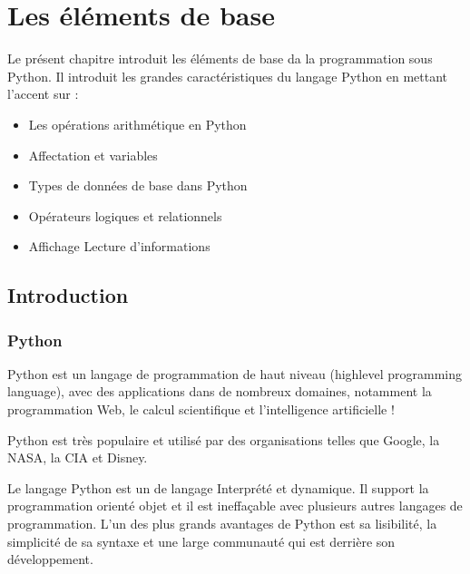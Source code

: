 \documentclass[letterpaper,10pt,french]{sphinxmanual}
\begin{document}
\chapter{Les éléments de base}
\label{\detokenize{content1:les-elements-de-base}}\label{\detokenize{content1::doc}}
\sphinxAtStartPar
Le présent chapitre introduit les éléments de base da la programmation sous Python. Il introduit les grandes caractéristiques du langage Python en mettant l’accent sur :
\begin{itemize}
\item {} 
\sphinxAtStartPar
Les opérations arithmétique en Python

\item {} 
\sphinxAtStartPar
Affectation et variables

\item {} 
\sphinxAtStartPar
Types de données de base dans Python

\item {} 
\sphinxAtStartPar
Opérateurs logiques et relationnels

\item {} 
\sphinxAtStartPar
Affichage Lecture d’informations

\end{itemize}


\section{Introduction}
\label{\detokenize{ch1:introduction}}\label{\detokenize{ch1::doc}}

\subsection{Python}
\label{\detokenize{ch1:python}}
\sphinxAtStartPar
Python est un langage de programmation de haut niveau (high\sphinxhyphen{}level programming language), avec des applications dans de nombreux domaines, notamment la programmation Web, le calcul scientifique et l’intelligence artificielle !

\sphinxAtStartPar
Python est très populaire et utilisé par des organisations telles que Google, la NASA, la CIA et Disney.

\sphinxAtStartPar
Le langage Python est un de langage Interprété et dynamique. Il support la programmation orienté objet et il est ineffaçable avec plusieurs autres langages de programmation. L’un des plus grands avantages de Python est sa lisibilité, la simplicité de sa syntaxe et une large communauté qui est derrière son développement.
\end{document}
